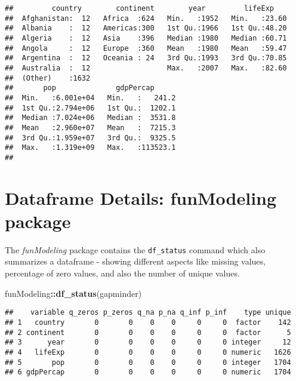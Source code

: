 \documentclass[]{book}
\newenvironment{Shaded}{\begin{snugshade}}{\end{snugshade}}
\newcommand{\KeywordTok}[1]{\textcolor[rgb]{0.13,0.29,0.53}{\textbf{#1}}}
\newcommand{\StringTok}[1]{\textcolor[rgb]{0.31,0.60,0.02}{#1}}
\newcommand{\CommentTok}[1]{\textcolor[rgb]{0.56,0.35,0.01}{\textit{#1}}}
\newcommand{\OperatorTok}[1]{\textcolor[rgb]{0.81,0.36,0.00}{\textbf{#1}}}
\newcommand{\NormalTok}[1]{#1}
\begin{document}
\begin{Shaded}
\end{Shaded}

\begin{verbatim}
##         country        continent        year         lifeExp     
##  Afghanistan:  12   Africa  :624   Min.   :1952   Min.   :23.60  
##  Albania    :  12   Americas:300   1st Qu.:1966   1st Qu.:48.20  
##  Algeria    :  12   Asia    :396   Median :1980   Median :60.71  
##  Angola     :  12   Europe  :360   Mean   :1980   Mean   :59.47  
##  Argentina  :  12   Oceania : 24   3rd Qu.:1993   3rd Qu.:70.85  
##  Australia  :  12                  Max.   :2007   Max.   :82.60  
##  (Other)    :1632                                                
##       pop              gdpPercap       
##  Min.   :6.001e+04   Min.   :   241.2  
##  1st Qu.:2.794e+06   1st Qu.:  1202.1  
##  Median :7.024e+06   Median :  3531.8  
##  Mean   :2.960e+07   Mean   :  7215.3  
##  3rd Qu.:1.959e+07   3rd Qu.:  9325.5  
##  Max.   :1.319e+09   Max.   :113523.1  
## 
\end{verbatim}

\section{Dataframe Details: funModeling
package}\label{dataframe-details-funmodeling-package}

The \emph{funModeling} package contains the \texttt{df\_status} command
which also summarizes a dataframe - showing different aspects like
missing values, percentage of zero values, and also the number of unique
values.

\begin{Shaded}
\begin{Highlighting}[]
\NormalTok{funModeling}\OperatorTok{::}\KeywordTok{df_status}\NormalTok{(gapminder)}
\end{Highlighting}
\end{Shaded}

\begin{verbatim}
##    variable q_zeros p_zeros q_na p_na q_inf p_inf    type unique
## 1   country       0       0    0    0     0     0  factor    142
## 2 continent       0       0    0    0     0     0  factor      5
## 3      year       0       0    0    0     0     0 integer     12
## 4   lifeExp       0       0    0    0     0     0 numeric   1626
## 5       pop       0       0    0    0     0     0 integer   1704
## 6 gdpPercap       0       0    0    0     0     0 numeric   1704
\end{verbatim}
\end{document}
